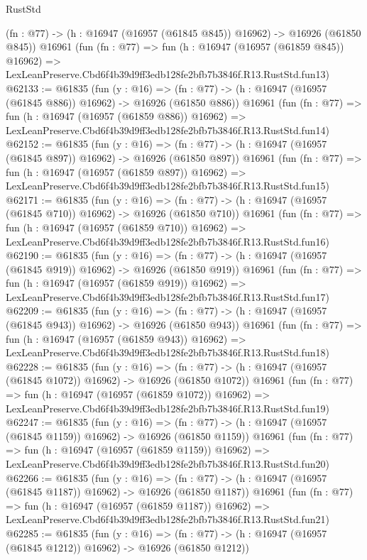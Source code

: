 \begin{lexlean}{RustStd}
\begin{coremodule}
    (fn : @77) -> (h : @16947 (@16957 (@61845 @845)) @16962) -> @16926 (@61850 @845))
    @16961
    (fun (fn : @77) =>
    fun (h : @16947 (@16957 (@61859 @845)) @16962) =>
    LexLeanPreserve.Cbd6f4b39d9ff3edb128fe2bfb7b3846f.R13.RustStd.fun13)
@62133 := @61835
    (fun (y : @16) =>
    (fn : @77) -> (h : @16947 (@16957 (@61845 @886)) @16962) -> @16926 (@61850 @886))
    @16961
    (fun (fn : @77) =>
    fun (h : @16947 (@16957 (@61859 @886)) @16962) =>
    LexLeanPreserve.Cbd6f4b39d9ff3edb128fe2bfb7b3846f.R13.RustStd.fun14)
@62152 := @61835
    (fun (y : @16) =>
    (fn : @77) -> (h : @16947 (@16957 (@61845 @897)) @16962) -> @16926 (@61850 @897))
    @16961
    (fun (fn : @77) =>
    fun (h : @16947 (@16957 (@61859 @897)) @16962) =>
    LexLeanPreserve.Cbd6f4b39d9ff3edb128fe2bfb7b3846f.R13.RustStd.fun15)
@62171 := @61835
    (fun (y : @16) =>
    (fn : @77) -> (h : @16947 (@16957 (@61845 @710)) @16962) -> @16926 (@61850 @710))
    @16961
    (fun (fn : @77) =>
    fun (h : @16947 (@16957 (@61859 @710)) @16962) =>
    LexLeanPreserve.Cbd6f4b39d9ff3edb128fe2bfb7b3846f.R13.RustStd.fun16)
@62190 := @61835
    (fun (y : @16) =>
    (fn : @77) -> (h : @16947 (@16957 (@61845 @919)) @16962) -> @16926 (@61850 @919))
    @16961
    (fun (fn : @77) =>
    fun (h : @16947 (@16957 (@61859 @919)) @16962) =>
    LexLeanPreserve.Cbd6f4b39d9ff3edb128fe2bfb7b3846f.R13.RustStd.fun17)
@62209 := @61835
    (fun (y : @16) =>
    (fn : @77) -> (h : @16947 (@16957 (@61845 @943)) @16962) -> @16926 (@61850 @943))
    @16961
    (fun (fn : @77) =>
    fun (h : @16947 (@16957 (@61859 @943)) @16962) =>
    LexLeanPreserve.Cbd6f4b39d9ff3edb128fe2bfb7b3846f.R13.RustStd.fun18)
@62228 := @61835
    (fun (y : @16) =>
    (fn : @77) -> (h : @16947 (@16957 (@61845 @1072)) @16962) -> @16926 (@61850 @1072))
    @16961
    (fun (fn : @77) =>
    fun (h : @16947 (@16957 (@61859 @1072)) @16962) =>
    LexLeanPreserve.Cbd6f4b39d9ff3edb128fe2bfb7b3846f.R13.RustStd.fun19)
@62247 := @61835
    (fun (y : @16) =>
    (fn : @77) -> (h : @16947 (@16957 (@61845 @1159)) @16962) -> @16926 (@61850 @1159))
    @16961
    (fun (fn : @77) =>
    fun (h : @16947 (@16957 (@61859 @1159)) @16962) =>
    LexLeanPreserve.Cbd6f4b39d9ff3edb128fe2bfb7b3846f.R13.RustStd.fun20)
@62266 := @61835
    (fun (y : @16) =>
    (fn : @77) -> (h : @16947 (@16957 (@61845 @1187)) @16962) -> @16926 (@61850 @1187))
    @16961
    (fun (fn : @77) =>
    fun (h : @16947 (@16957 (@61859 @1187)) @16962) =>
    LexLeanPreserve.Cbd6f4b39d9ff3edb128fe2bfb7b3846f.R13.RustStd.fun21)
@62285 := @61835
    (fun (y : @16) =>
    (fn : @77) -> (h : @16947 (@16957 (@61845 @1212)) @16962) -> @16926 (@61850 @1212))

\end{coremodule}
\end{lexlean}
